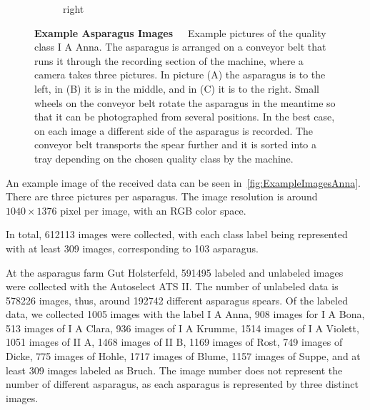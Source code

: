 \begin{figure}[h]
\begin{subfigure}{0.3\textwidth}
		\caption{right}
	\end{subfigure}
    \caption[Example Asparagus Images]{\textbf{Example Asparagus Images}~~~Example pictures of the quality class I A Anna. The asparagus is arranged on a conveyor belt that runs it through the recording section of the machine, where a camera takes three pictures. In picture (A) the asparagus is to the left, in (B) it is in the middle, and in (C) it is to the right. Small wheels on the conveyor belt rotate the asparagus in the meantime so that it can be photographed from several positions. In the best case, on each image a different side of the asparagus is recorded. The conveyor belt transports the spear further and it is sorted into a tray depending on the chosen quality class by the machine. 
}
    \label{fig:ExampleImagesAnna}
\end{figure}

\bigskip
An example image of the received data can be seen in~\autoref{fig:ExampleImagesAnna}. There are three pictures per asparagus. The image resolution is around $1040\times1376$ pixel per image, with an RGB color space.

In total, 612113 images were collected, with each class label being represented with at least 309 images, corresponding to 103 asparagus.

At the asparagus farm Gut Holsterfeld, 591495 labeled and unlabeled images were collected with the Autoselect ATS II. The number of unlabeled data is 578226 images, thus, around 192742 different asparagus spears. Of the labeled data, we collected 1005 images with the label I A Anna,  908 images for I A Bona, 513 images of I A Clara, 936 images of I A Krumme, 1514 images of I A Violett, 1051 images of II A, 1468 images of II B, 1169 images of Rost, 749 images of Dicke, 775 images of Hohle, 1717 images of Blume, 1157 images of Suppe, and at least 309 images labeled as Bruch. The image number does not represent the number of different asparagus, as each asparagus is represented by three distinct images.

